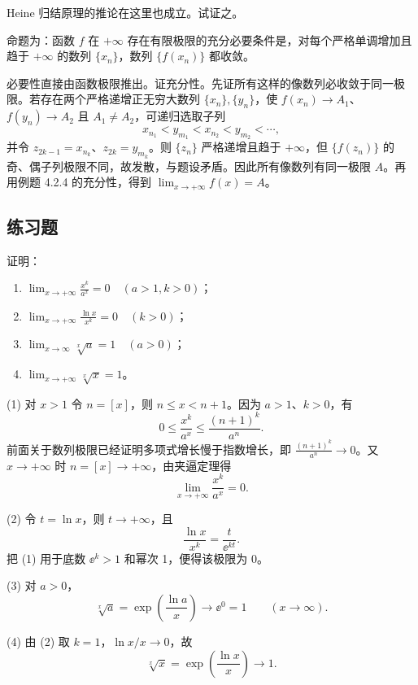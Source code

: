 \begin{xthought}
Heine 归结原理的推论在这里也成立。试证之。
\end{xthought}
\begin{xsolution}
命题为：函数 $f$ 在 $+\infty$ 存在有限极限的充分必要条件是，对每个严格单调增加且趋于 $+\infty$ 的数列 $\{x_n\}$，数列 $\{f(x_n)\}$ 都收敛。

必要性直接由函数极限推出。证充分性。先证所有这样的像数列必收敛于同一极限。若存在两个严格递增正无穷大数列 $\{x_n\},\{y_n\}$，使
$f(x_n)\to A_1$、$f(y_n)\to A_2$ 且 $A_1\ne A_2$，可递归选取子列
\[
  x_{n_1}<y_{m_1}<x_{n_2}<y_{m_2}<\cdots,
\]
并令 $z_{2k-1}=x_{n_k}$、$z_{2k}=y_{m_k}$。则 $\{z_n\}$ 严格递增且趋于 $+\infty$，但 $\{f(z_n)\}$ 的奇、偶子列极限不同，故发散，与题设矛盾。因此所有像数列有同一极限 $A$。再用例题 4.2.4 的充分性，得到 $\lim_{x\to+\infty}f(x)=A$。
\end{xsolution}


\subsection{练习题}

\begin{xexercise}[1]
证明：
  \begin{enumerate}
    \item $\displaystyle\lim_{x\to+\infty}\frac{x^k}{a^x}=0\quad(a>1,k>0)$；
    \item $\displaystyle\lim_{x\to+\infty}\frac{\ln x}{x^k}=0\quad(k>0)$；
    \item $\displaystyle\lim_{x\to\infty}\sqrt[x]{a}=1\quad(a>0)$；
    \item $\displaystyle\lim_{x\to+\infty}\sqrt[x]{x}=1$。
  \end{enumerate}
\end{xexercise}
\begin{xsolution}
(1) 对 $x>1$ 令 $n=[x]$，则 $n\leq x<n+1$。因为 $a>1$、$k>0$，有
\[
  0\leq\frac{x^k}{a^x}
  \leq\frac{(n+1)^k}{a^n}.
\]
前面关于数列极限已经证明多项式增长慢于指数增长，即
$\frac{(n+1)^k}{a^n}\to0$。又 $x\to+\infty$ 时 $n=[x]\to+\infty$，由夹逼定理得
\[
  \lim_{x\to+\infty}\frac{x^k}{a^x}=0.
\]

(2) 令 $t=\ln x$，则 $t\to+\infty$，且
\[
  \frac{\ln x}{x^k}=\frac{t}{\ee^{kt}}.
\]
把 (1) 用于底数 $\ee^k>1$ 和幂次 1，便得该极限为 0。

(3) 对 $a>0$，
\[
  \sqrt[x]a=\exp\left(\frac{\ln a}{x}\right)\to\ee^0=1
  \qquad(x\to\infty).
\]

(4) 由 (2) 取 $k=1$，$\ln x/x\to0$，故
\[
  \sqrt[x]x=\exp\left(\frac{\ln x}{x}\right)\to1.
\]
\end{xsolution}



